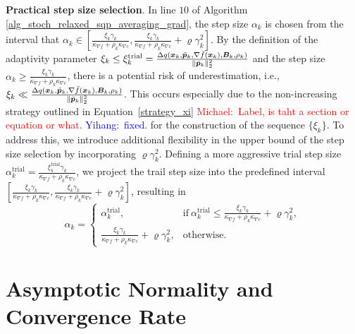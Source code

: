 \documentclass[aos]{imsart}
\numberwithin{equation}{section}
\theoremstyle{plain}
\newcommand{\michael}[1]{\textcolor{red}{Michael:\ #1}}
\newcommand{\yihang}[1]{\textcolor{blue}{Yihang:\ #1}}
\begin{document}
\textbf{Practical step size selection}. In line $10$ of  Algorithm \ref{alg_stoch_relaxed_sqp_averaging_grad},
the step size $\alpha_k$ is chosen from the interval that $\alpha_k \in  \left[ \frac{ \xi_{k}\gamma_k}{\kappa_{\nabla f} + \rho_k \kappa_{\nabla c}} , \frac{ \xi_{k}\gamma_k}{\kappa_{\nabla f} + \rho_k \kappa_{\nabla c}} + \varrho \gamma_k^2 \right]$. 
By the definition of the adaptivity parameter $\xi_k \leq \xi_{k}^{\text{trial}} =  \frac{\Delta q(\bm{x}_k,\Bar{\bm{p}}_k, \nabla \Bar{f}(\bm{x}_k),\bm{B}_k,\rho_k)}{\|\Bar{\bm{p}}_k\|_2^2}$ and the step size $\alpha_k \geq \frac{ \xi_{k}\gamma_k}{\kappa_{\nabla f} + \rho_k \kappa_{\nabla c}} $, there is a potential risk of underestimation, i.e., $\xi_k \ll  \frac{\Delta q(\bm{x}_k,\Bar{\bm{p}}_k, \nabla \Bar{f}(\bm{x}_k),\bm{B}_k,\rho_k)}{\|\Bar{\bm{p}}_k\|_2^2}$. This occurs especially due to the non-increasing strategy outlined in Equation~\eqref{strategy_xi}
\michael{Label, is taht a section or equation or what.}
\yihang{fixed.}
for the construction of the sequence $\{\xi_k\}$. To address this, we introduce additional flexibility in the upper bound of the step size selection by incorporating $\varrho \gamma_k^2$. Defining a more aggressive trial step size $\alpha_k^{\text{trial}} =  \frac{ \xi_{k}^{\text{trial}}\gamma_k}{\kappa_{\nabla f} + \rho_k \kappa_{\nabla c}} $, we project the trail step size into the predefined interval $\left[ \frac{ \xi_{k}\gamma_k}{\kappa_{\nabla f} + \rho_k \kappa_{\nabla c}}, \frac{ \xi_{k}\gamma_k}{\kappa_{\nabla f} + \rho_k \kappa_{\nabla c}} + \varrho \gamma_k^2 \right]$, resulting in 
\begin{equation}
    \alpha_k = \left\{ \begin{array}{cc}
       \alpha_k^{\text{trial}},  & \text{if}~\alpha_k^{\text{trial}} \leq \frac{ \xi_{k}\gamma_k}{\kappa_{\nabla f} + \rho_k \kappa_{\nabla c}} + \varrho \gamma_k^2, \\
       \frac{ \xi_{k}\gamma_k}{\kappa_{\nabla f} + \rho_k \kappa_{\nabla c}} + \varrho \gamma_k^2,  & \text{otherwise}. 
    \end{array} \right.
\end{equation}


\section{Asymptotic Normality and Convergence Rate}
\label{sec:asymptotic}
\end{document}

